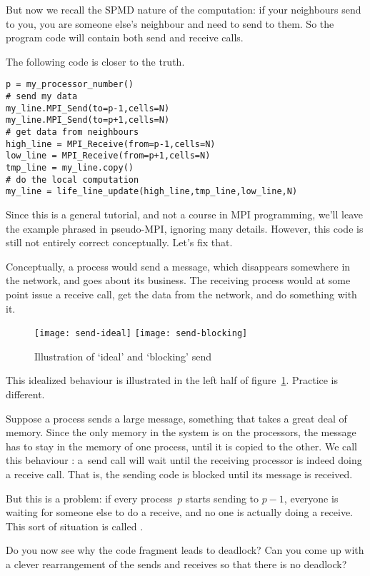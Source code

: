 But now we recall the \ac{SPMD} nature of the computation: 
if your neighbours send to you, you are someone else's neighbour and
need to send to them. So the program code will contain both
send and receive calls.

The following code is closer to the truth.
\begin{verbatim}
p = my_processor_number()
# send my data
my_line.MPI_Send(to=p-1,cells=N)
my_line.MPI_Send(to=p+1,cells=N)
# get data from neighbours
high_line = MPI_Receive(from=p-1,cells=N)
low_line = MPI_Receive(from=p+1,cells=N)
tmp_line = my_line.copy()
# do the local computation
my_line = life_line_update(high_line,tmp_line,low_line,N)
\end{verbatim}
Since this is a general tutorial, and not a course in MPI programming,
we'll leave the example phrased in pseudo-MPI, ignoring many details.
However, this code is still not entirely
correct conceptually. Let's fix that.

Conceptually, a process would send a message, which disappears
somewhere in the network, and goes about its business.
The receiving process would at some point issue a receive call,
get the data from the network, and do something with it.
\begin{figure}
  \leavevmode
  \texttt{[image: send-ideal]}\hfill
  \texttt{[image: send-blocking]}
  \caption{Illustration of `ideal' and `blocking' send}
  \label{fig:cw-send-blocking}
\end{figure}
This idealized behaviour is illustrated in the left half of
figure~\ref{fig:cw-send-blocking}. Practice is different.

Suppose a process sends a large message, something that takes
a great deal of memory. Since the only memory in the system
is on the processors, the message has to stay in the memory 
of one process, until it is copied to the other.
We call this behaviour :
a~send call will wait until the receiving processor is
indeed doing a receive call. That is, the sending code is blocked
until its message is received.

But this is a problem: if every process~$p$ starts sending to $p-1$,
everyone is waiting for someone else to do a receive, and no one is
actually doing a receive. This sort of situation is called
.

\begin{exercise}
  Do you now see why the code fragment
  leads to deadlock? Can you come up with a clever rearrangement of the sends 
  and receives so that there is no deadlock?
\end{exercise}

